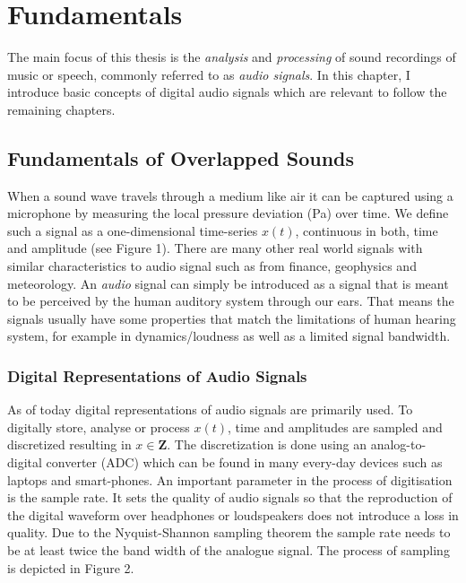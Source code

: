 \hypertarget{fundamentals}{%
\chapter{Fundamentals}\label{fundamentals}}


The main focus of this thesis is the \emph{analysis} and \emph{processing} of sound recordings of music or speech, commonly referred to as \emph{audio signals}.
In this chapter, I introduce basic concepts of digital audio signals which are relevant to follow the remaining chapters.

\hypertarget{Fundamentals of Overlapped Sounds}{%
\section{Fundamentals of Overlapped Sounds}\label{specifics-of-audio-signals}}

When a sound wave travels through a medium like air it can be captured using a microphone by measuring the local pressure deviation (Pa) over time.
We define such a signal as a one-dimensional time-series \(x(t)\), continuous in both, time and amplitude (see Figure 1).
There are many other real world signals with similar characteristics to audio signal such as from finance, geophysics and meteorology.
An \emph{audio} signal can simply be introduced as a signal that is meant to be perceived by the human auditory system through our ears.
That means the signals usually have some properties that match the limitations of human hearing system, for example in dynamics/loudness as well as a limited signal bandwidth.

\hypertarget{digital-representations-of-audio-signals}{%
\subsection{Digital Representations of Audio
Signals}\label{digital-representations-of-audio-signals}}

As of today digital representations of audio signals are primarily used.
To digitally store, analyse or process \(x(t)\), time and amplitudes are sampled and discretized resulting in \(x \in \mathbf{Z}\).
The discretization is done using an analog-to-digital converter (ADC) which can be found in many every-day devices such as laptops and smart-phones.
An important parameter in the process of digitisation is the sample rate.
It sets the quality of audio signals so that the reproduction of the digital waveform over headphones or loudspeakers does not introduce a loss in quality. Due to the Nyquist-Shannon sampling theorem the sample rate needs to be at least twice the band width of the analogue signal.
The process of sampling is depicted in Figure 2.\\

